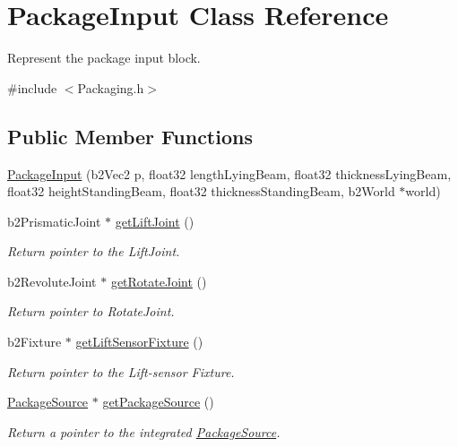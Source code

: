 \hypertarget{classPackageInput}{\section{Package\-Input Class Reference}
\label{classPackageInput}
}


Represent the package input block.  




{\ttfamily \#include $<$Packaging.\-h$>$}

\subsection*{Public Member Functions}
\begin{DoxyCompactItemize}
\item 
\hyperlink{classPackageInput_a2e389eca02f5080d568100127111ebb2}{Package\-Input} (b2\-Vec2 p, float32 length\-Lying\-Beam, float32 thickness\-Lying\-Beam, float32 height\-Standing\-Beam, float32 thickness\-Standing\-Beam, b2\-World $\ast$world)
\item 
b2\-Prismatic\-Joint $\ast$ \hyperlink{classPackageInput_a00aaf542b9486a48271c844f3b1094c4}{get\-Lift\-Joint} ()
\begin{DoxyCompactList}\small\item\em Return pointer to the Lift\-Joint. \end{DoxyCompactList}\item 
b2\-Revolute\-Joint $\ast$ \hyperlink{classPackageInput_a0f3e4bc745c2a7589db8b9fd085616b7}{get\-Rotate\-Joint} ()
\begin{DoxyCompactList}\small\item\em Return pointer to Rotate\-Joint. \end{DoxyCompactList}\item 
b2\-Fixture $\ast$ \hyperlink{classPackageInput_aa09daf2e760c70438acc2a34b7ad4cc6}{get\-Lift\-Sensor\-Fixture} ()
\begin{DoxyCompactList}\small\item\em Return pointer to the Lift-\/sensor Fixture. \end{DoxyCompactList}\item 
\hyperlink{classPackageSource}{Package\-Source} $\ast$ \hyperlink{classPackageInput_a1084874e9c444dbefb167ad3c6e09a53}{get\-Package\-Source} ()
\begin{DoxyCompactList}\small\item\em Return a pointer to the integrated \hyperlink{classPackageSource}{Package\-Source}. \end{DoxyCompactList}\end{DoxyCompactItemize}
